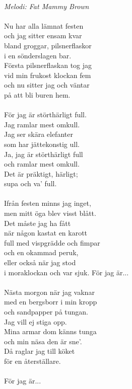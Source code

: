 \\
{\footnotesize\textit{Melodi: Fat Mammy Brown}}\\
\\
Nu har alla lämnat festen\\
och jag sitter ensam kvar\\
bland groggar, pilsnerflaskor\\
i en sönderslagen bar.\\
Första pilsnerflaskan tog jag\\
vid min frukost klockan fem\\
och nu sitter jag och väntar\\
på att bli buren hem.\\
\\
För jag är störthärligt full.\\
Jag ramlar mest omkull.\\
Jag ser skära elefanter \\
som har jättekonstig ull.\\
Ja, jag är störthärligt full\\
och ramlar mest omkull.\\
Det är präktigt, härligt;\\
supa och va' full.\\
\\
Ifrån festen minns jag inget,\\
men mitt öga blev visst blått.\\
Det måste jag ha fått\\
när någon kastat en karott\\
full med vispgrädde och fimpar\\
och en okammad peruk,\\
eller också när jag stod\\
i moraklockan och var sjuk.
\newpage
För jag är...\\
\\
Nästa morgon när jag vaknar\\
med en bergsborr i min kropp\\
och sandpapper på tungan.\\
Jag vill ej stiga opp.\\
Mina armar dom känns tunga\\
och min näsa den är sne'.\\
Då raglar jag till köket\\
för en återställare.\\
\\
För jag är...
